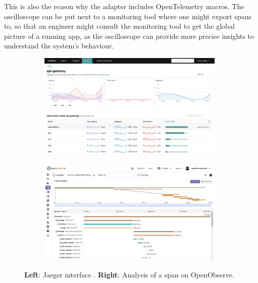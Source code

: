         This is also the reason why the adapter includes OpenTelemetry macros. The oscilloscope can be put next to a monitoring tool where one might export spans to, so that an engineer might consult the monitoring tool to get the global picture of a running app, as the oscilloscope can provide more precise insights to understand the system's behaviour. 
       \begin{figure}[H]
            \centering
            \begin{subfigure}{.5\textwidth}
                \centering
                \includegraphics[width=0.98\textwidth]{img/jaeger.png}
                \label{fig:jag}
            \end{subfigure}%
            \begin{subfigure}{.5\textwidth}
                \centering
                \includegraphics[width =0.98\textwidth]{img/jaeger2.jpg}
                \label{fig:openobs}
            \end{subfigure}
            \caption{\textbf{Left}: Jaeger interface \cite{otel-p}. \textbf{Right}: Analysis of a span on OpenObserve. \cite{tr-e}}
            \label{fig:monitor}
            \end{figure}

